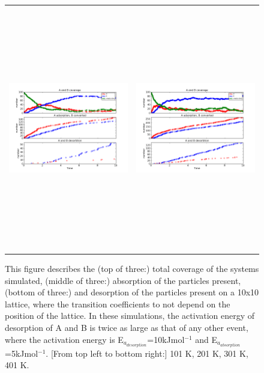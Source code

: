 \documentclass[11pt]{article}
\begin{document}
\begin{figure}[h!]
\begin{tabular}{cc}
\includegraphics[width=3.5in, height=4.2in]{./coadsorb_irreversible/AtoBirreversible10x10_301_desorb2x_Ea5E3_Ed10E3_3.png} &
\includegraphics[width=3.5in, height=4.2in]{./coadsorb_irreversible/AtoBirreversible10x10_401_desorb2x_Ea5E3_Ed10E3_3.png}
\end{tabular}
\caption{This figure describes the (top of three:) total coverage of the systems simulated, (middle of three:) absorption of the particles present, (bottom of three:) and desorption of the particles present on a 10x10 lattice, where the transition coefficients to not depend on the position of the lattice. In these simulations, the activation energy of desorption of A and B is twice as large as that of any other event, where the activation energy is E$_{a_{desorption}}$=10kJmol$^{-1}$ and E$_{a_{absorption}}$=5kJmol$^{-1}$. [From top left to bottom right:] 101 K, 201 K, 301 K, 401 K. }
\end{figure}
\end{document}
